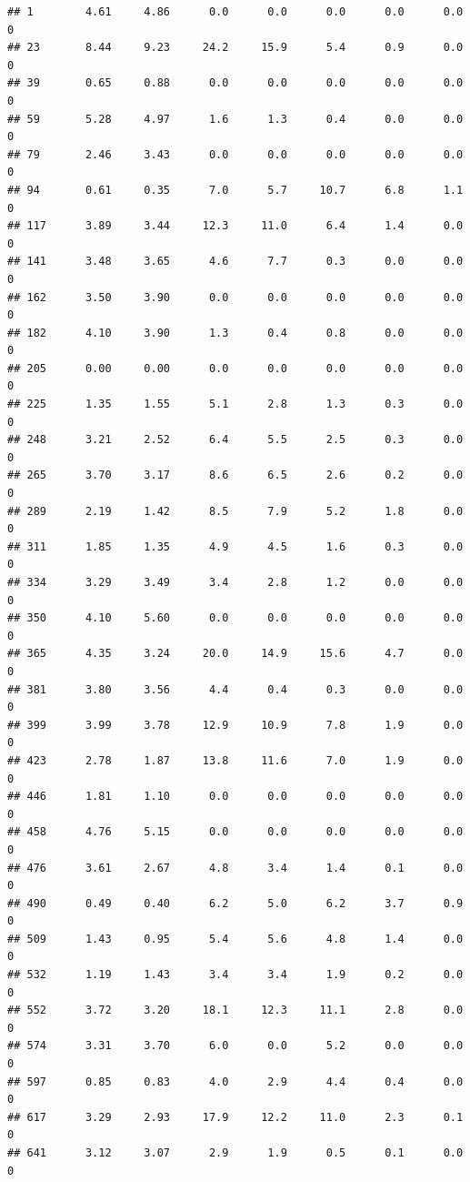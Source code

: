 \documentclass[
]{article}
\begin{document}
\begin{verbatim}
## 1        4.61     4.86      0.0      0.0      0.0      0.0      0.0        0
## 23       8.44     9.23     24.2     15.9      5.4      0.9      0.0        0
## 39       0.65     0.88      0.0      0.0      0.0      0.0      0.0        0
## 59       5.28     4.97      1.6      1.3      0.4      0.0      0.0        0
## 79       2.46     3.43      0.0      0.0      0.0      0.0      0.0        0
## 94       0.61     0.35      7.0      5.7     10.7      6.8      1.1        0
## 117      3.89     3.44     12.3     11.0      6.4      1.4      0.0        0
## 141      3.48     3.65      4.6      7.7      0.3      0.0      0.0        0
## 162      3.50     3.90      0.0      0.0      0.0      0.0      0.0        0
## 182      4.10     3.90      1.3      0.4      0.8      0.0      0.0        0
## 205      0.00     0.00      0.0      0.0      0.0      0.0      0.0        0
## 225      1.35     1.55      5.1      2.8      1.3      0.3      0.0        0
## 248      3.21     2.52      6.4      5.5      2.5      0.3      0.0        0
## 265      3.70     3.17      8.6      6.5      2.6      0.2      0.0        0
## 289      2.19     1.42      8.5      7.9      5.2      1.8      0.0        0
## 311      1.85     1.35      4.9      4.5      1.6      0.3      0.0        0
## 334      3.29     3.49      3.4      2.8      1.2      0.0      0.0        0
## 350      4.10     5.60      0.0      0.0      0.0      0.0      0.0        0
## 365      4.35     3.24     20.0     14.9     15.6      4.7      0.0        0
## 381      3.80     3.56      4.4      0.4      0.3      0.0      0.0        0
## 399      3.99     3.78     12.9     10.9      7.8      1.9      0.0        0
## 423      2.78     1.87     13.8     11.6      7.0      1.9      0.0        0
## 446      1.81     1.10      0.0      0.0      0.0      0.0      0.0        0
## 458      4.76     5.15      0.0      0.0      0.0      0.0      0.0        0
## 476      3.61     2.67      4.8      3.4      1.4      0.1      0.0        0
## 490      0.49     0.40      6.2      5.0      6.2      3.7      0.9        0
## 509      1.43     0.95      5.4      5.6      4.8      1.4      0.0        0
## 532      1.19     1.43      3.4      3.4      1.9      0.2      0.0        0
## 552      3.72     3.20     18.1     12.3     11.1      2.8      0.0        0
## 574      3.31     3.70      6.0      0.0      5.2      0.0      0.0        0
## 597      0.85     0.83      4.0      2.9      4.4      0.4      0.0        0
## 617      3.29     2.93     17.9     12.2     11.0      2.3      0.1        0
## 641      3.12     3.07      2.9      1.9      0.5      0.1      0.0        0

\end{verbatim}
\end{document}
